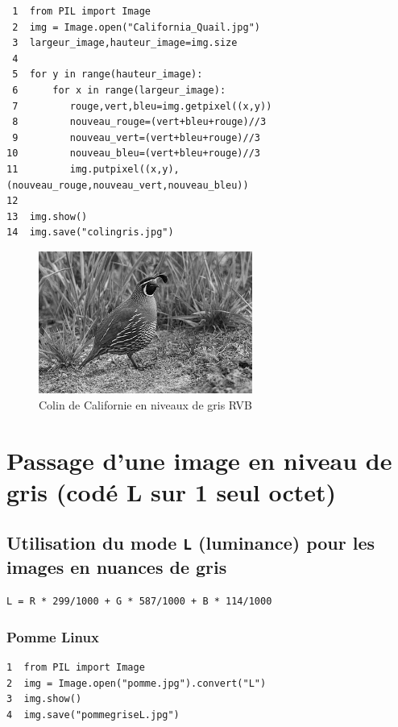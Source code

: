 \documentclass[11pt]{article}
\begin{document}
\begin{verbatim}
 1  from PIL import Image
 2  img = Image.open("California_Quail.jpg")
 3  largeur_image,hauteur_image=img.size
 4  
 5  for y in range(hauteur_image):
 6      for x in range(largeur_image):
 7         rouge,vert,bleu=img.getpixel((x,y))
 8         nouveau_rouge=(vert+bleu+rouge)//3
 9         nouveau_vert=(vert+bleu+rouge)//3
10         nouveau_bleu=(vert+bleu+rouge)//3
11         img.putpixel((x,y),(nouveau_rouge,nouveau_vert,nouveau_bleu))
12  
13  img.show()
14  img.save("colingris.jpg")
\end{verbatim}

\begin{figure}[htbp]
\centering
\includegraphics[width=7cm]{colingris.jpg}
\caption{Colin de Californie en niveaux de gris RVB}
\end{figure}


\section{Passage d'une image en niveau de gris (codé L sur 1 seul octet)}
\label{sec:org0e02db9}


\subsection{Utilisation du mode \texttt{L} (luminance) pour les images en nuances de gris}
\label{sec:org572bd15}


\begin{verbatim}
L = R * 299/1000 + G * 587/1000 + B * 114/1000
\end{verbatim}

\subsubsection{Pomme Linux}
\label{sec:org498adaf}

\begin{verbatim}
1  from PIL import Image
2  img = Image.open("pomme.jpg").convert("L")
3  img.show()
4  img.save("pommegriseL.jpg")
\end{verbatim}
\end{document}
